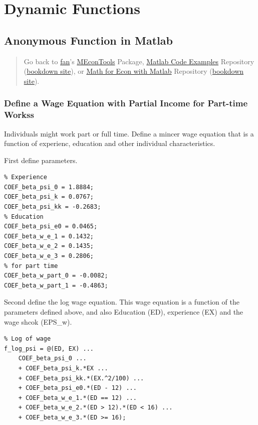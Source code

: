 \documentclass[
]{book}
\begin{document}
\hypertarget{dynamic-functions}{%
\section{Dynamic Functions}\label{dynamic-functions}}

\hypertarget{anonymous-function-in-matlab}{%
\subsection{Anonymous Function in Matlab}\label{anonymous-function-in-matlab}}

\begin{quote}
Go back to \href{http://fanwangecon.github.io/}{fan}'s \href{https://fanwangecon.github.io/MEconTools/}{MEconTools} Package, \href{https://fanwangecon.github.io/M4Econ/}{Matlab Code Examples} Repository (\href{https://fanwangecon.github.io/M4Econ/bookdown}{bookdown site}), or \href{https://fanwangecon.github.io/Math4Econ/}{Math for Econ with Matlab} Repository (\href{https://fanwangecon.github.io/Math4Econ/bookdown}{bookdown site}).
\end{quote}

\hypertarget{define-a-wage-equation-with-partial-income-for-part-time-workss}{%
\subsubsection{Define a Wage Equation with Partial Income for Part-time Workss}\label{define-a-wage-equation-with-partial-income-for-part-time-workss}}

Individuals might work part or full time. Define a mincer wage equation
that is a function of experienc, education and other individual
characteristics.

First define parameters.

\begin{verbatim}
% Experience
COEF_beta_psi_0 = 1.8884;
COEF_beta_psi_k = 0.0767;
COEF_beta_psi_kk = -0.2683;
% Education
COEF_beta_psi_e0 = 0.0465;
COEF_beta_w_e_1 = 0.1432;
COEF_beta_w_e_2 = 0.1435;
COEF_beta_w_e_3 = 0.2806;
% for part time
COEF_beta_w_part_0 = -0.0082;
COEF_beta_w_part_1 = -0.4863;
\end{verbatim}

Second define the log wage equation. This wage equation is a function of
the parameters defined above, and also Education (ED), experience (EX)
and the wage shcok (EPS\_w).

\begin{verbatim}
% Log of wage
f_log_psi = @(ED, EX) ...
    COEF_beta_psi_0 ...
    + COEF_beta_psi_k.*EX ...
    + COEF_beta_psi_kk.*(EX.^2/100) ...
    + COEF_beta_psi_e0.*(ED - 12) ...
    + COEF_beta_w_e_1.*(ED == 12) ...
    + COEF_beta_w_e_2.*(ED > 12).*(ED < 16) ...
    + COEF_beta_w_e_3.*(ED >= 16);
\end{verbatim}
\end{document}
